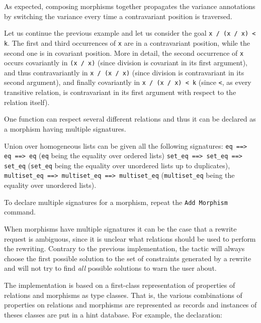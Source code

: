 As expected, composing morphisms together propagates the variance annotations by
switching the variance every time a contravariant position is traversed.
\begin{cscexample}
Let us continue the previous example and let us consider the goal
\texttt{x / (x / x) < k}. The first and third occurrences of \texttt{x} are
in a contravariant position, while the second one is in covariant position.
More in detail, the second occurrence of \texttt{x} occurs
covariantly in \texttt{(x / x)} (since division is covariant in its first
argument), and thus contravariantly in \texttt{x / (x / x)} (since division
is contravariant in its second argument), and finally covariantly in
\texttt{x / (x / x) < k} (since \texttt{<}, as every transitive relation,
is contravariant in its first argument with respect to the relation itself).
\end{cscexample}

One function can respect several different relations and thus it can be
declared as a morphism having multiple signatures.

\begin{cscexample}
Union over homogeneous lists can be given all the following signatures:
\texttt{eq ==> eq ==> eq} (\texttt{eq} being the equality over ordered lists)
\texttt{set\_eq ==> set\_eq ==> set\_eq} (\texttt{set\_eq} being the equality
over unordered lists up to duplicates),
\texttt{multiset\_eq ==> multiset\_eq ==> multiset\_eq} (\texttt{multiset\_eq}
being the equality over unordered lists).
\end{cscexample}

To declare multiple signatures for a morphism, repeat the \texttt{Add Morphism}
command.

When morphisms have multiple signatures it can be the case that a rewrite
request is ambiguous, since it is unclear what relations should be used to
perform the rewriting. Contrary to the previous implementation, the
tactic will always choose the first possible solution to the set of
constraints generated by a rewrite and will not try to find \emph{all}
possible solutions to warn the user about.

\label{setoid:first-class}

The implementation is based on a first-class representation of
properties of relations and morphisms as type classes. That is, 
the various combinations of properties on relations and morphisms 
are represented as records and instances of theses classes are put
in a hint database.
For example, the declaration:

